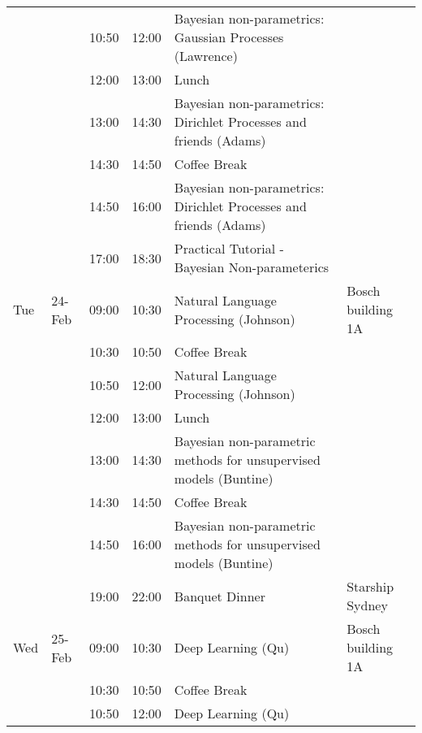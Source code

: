 \begin{table}[h]
\begin{tabular}{  l l l l p{7cm} l    }
    &        & 10:50 & 12:00 & Bayesian non-parametrics: Gaussian Processes (Lawrence)           &                   \\
    &        & 12:00 & 13:00 & Lunch                                                             &                   \\
    &        & 13:00 & 14:30 & Bayesian non-parametrics: Dirichlet Processes and friends (Adams) &                   \\
    &        & 14:30 & 14:50 & Coffee Break                                                      &                   \\
    &        & 14:50 & 16:00 & Bayesian non-parametrics: Dirichlet Processes and friends (Adams) &                   \\
    &        & 17:00 & 18:30 & Practical Tutorial  - Bayesian Non-parameterics                   &                   \\
Tue & 24-Feb & 09:00 & 10:30 & Natural Language Processing (Johnson)                             & Bosch building 1A \\
    &        & 10:30 & 10:50 & Coffee Break                                                      &                   \\
    &        & 10:50 & 12:00 & Natural Language Processing (Johnson)                             &                   \\
    &        & 12:00 & 13:00 & Lunch                                                             &                   \\
    &        & 13:00 & 14:30 & Bayesian non-parametric methods for unsupervised models (Buntine) &                   \\
    &        & 14:30 & 14:50 & Coffee Break                                                      &                   \\
    &        & 14:50 & 16:00 & Bayesian non-parametric methods for unsupervised models (Buntine) &                   \\
    &        & 19:00 & 22:00 & Banquet Dinner                                                    & Starship Sydney   \\
Wed & 25-Feb & 09:00 & 10:30 & Deep Learning (Qu)                                                & Bosch building 1A \\
    &        & 10:30 & 10:50 & Coffee Break                                                      &                   \\
    &        & 10:50 & 12:00 & Deep Learning (Qu)                                                &                   \\

\end{tabular}
\end{table}
